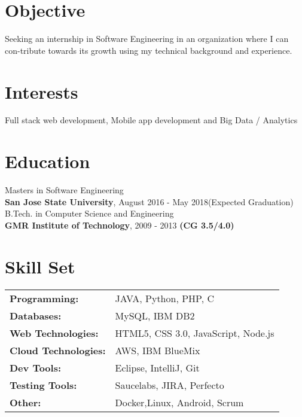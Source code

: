 \documentclass[margin]{res}
\begin{document}

\address{ \textbf{Phone}:\hspace{1mm}\href{+1-669-400-9729}{+1-669-400-9729}\hspace{5mm} \textbf{Github}:\hspace{1mm}\href{https://github.com/akshay-agarwal}{akshay-agarwal}\hspace{5mm}      \textbf{Email}:\hspace{1mm}\href{mailto:akshay.agwl@gmail.com}{akshay.agwl@gmail.com} }

\begin{resume}


\section{Objective }

  Seeking an internship in Software Engineering in an organization where I can con-tribute towards its growth using my technical background and experience.
  
\section{Interests}

  Full stack web development, Mobile app development and Big Data / Analytics

\section{Education}
  Masters in Software Engineering \\
  \vspace{1.5mm}
  {\bf San Jose State University}, August 2016 - May 2018(Expected Graduation) \\ 
  B.Tech. in Computer Science and Engineering \\
  {\bf GMR Institute of Technology}, 2009 - 2013 {\bf (CG 3.5/4.0) } \\
  
\section{Skill Set}
   \begin{tabular}{l p{3in}}
    {\bf Programming:} & JAVA, Python, PHP, C \\
    {\bf Databases:} &  MySQL, IBM DB2  \\
    {\bf Web Technologies:} &  HTML5, CSS 3.0, JavaScript, Node.js \\
    {\bf Cloud Technologies:} &  AWS, IBM BlueMix \\
    \bf {Dev Tools:} & Eclipse, IntelliJ, Git \\
    {\bf Testing Tools:} & Saucelabs, JIRA, Perfecto \\
    {\bf Other:} & Docker,Linux, Android, Scrum \\
     \end{tabular}


\end{resume}
\end{document}
